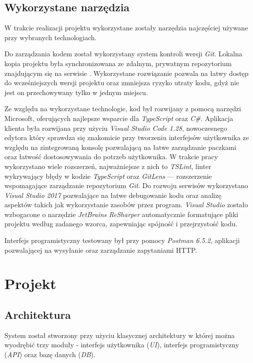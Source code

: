 \documentclass[eng,printmode,openany]{mgr}
\begin{document}
\section{Wykorzystane narzędzia}
W trakcie realizacji projektu wykorzystane zostały narzędzia najczęściej używane przy wybranych technologiach.

Do zarządzania kodem został wykorzystany system kontroli wersji \textit{Git}. Lokalna kopia projektu była synchronizowana ze zdalnym, prywatnym repozytorium znajdującym się na serwisie . Wykorzystane rozwiązanie pozwala na łatwy dostęp do wcześniejszych wersji projektu oraz zmniejsza ryzyko utraty kodu, gdyż nie jest on przechowywany tylko w jednym miejscu.

Ze względu na wykorzystane technologie, kod był rozwijany z pomocą narzędzi Microsoft, oferujących najlepsze wsparcie dla \textit{TypeScript} oraz \textit{C\#}. Aplikacja klienta była rozwijana przy użyciu \textit{Visual Studio Code 1.28}, nowoczesnego edytora który sprawdza się znakomicie przy tworzeniu interfejsów użytkownika ze względu na zintegrowaną konsolę pozwalającą na łatwe zarządzanie paczkami oraz łatwość dostosowywania do potrzeb użytkownika. W trakcie pracy wykorzystano wiele rozszerzeń, najważniejsze z nich to \textit{TSLint}, linter wykrywający błędy w kodzie \textit{TypeScript} oraz \textit{GitLens} — rozszerzenie wspomagające zarządzanie repozytorium \textit{Git}. Do rozwoju serwisów wykorzystano \textit{Visual Studio 2017} pozwalające na łatwe debugowanie kodu oraz analizę aspektów takich jak wykorzystanie zasobów przez program. \textit{Visual Studio} zostało wzbogacone o narzędzie \textit{JetBrains ReSharper} automatycznie formatujące pliki projektu według zadanego wzorca, zapewniając spójność i przejrzystość kodu.

Interfejs programistyczny testowany był przy pomocy \textit{Postman 6.5.2}, aplikacji pozwalającej na wysyłanie oraz zarządzanie zapytaniami HTTP.

\newpage
\chapter{Projekt}
\section{Architektura}
System został stworzony przy użyciu klasycznej architektury w której można wyodrębić trzy moduły - interfejs użytkownika (\textit{UI}), interfejs programistyczny (\textit{API}) oraz bazę danych (\textit{DB}). 
\end{document}

